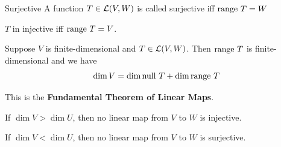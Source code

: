 \documentclass[12pt,a4paper]{article}
\begin{document}
    \begin{defi}{Surjective}
        A function $T\in\mathcal{L}(V,W)$ is called surjective iff $\operatorname{range\,}{T}=W$
    \end{defi}
    \begin{remark}
        $T$ in injective iff $\operatorname{range\,} T=V$.
    \end{remark}
    \hfill

    \begin{thm}\label{3.16}
        Suppose $V$ is finite-dimensional and $T\in\mathcal{L}(V,W)$. Then $\operatorname{range\,} T$ is finite-dimensional and we have
        $$\dim V=\dim\operatorname{null\,} T+\dim\operatorname{range\,}{T}$$
    \end{thm}
    \begin{remark}
        This is the \textbf{Fundamental Theorem of Linear Maps}.
    \end{remark}
    \begin{cor}\label{3.17}
        If $\dim V>\dim U$, then no linear map from $V$ to $W$ is injective.
    \end{cor}
    \begin{cor}
        If $\dim V<\dim U$, then no linear map from $V$ to $W$ is surjective.
    \end{cor}
    \hfill
\end{document}
